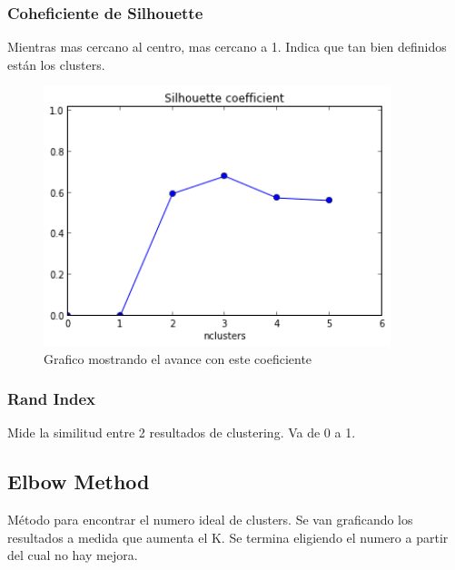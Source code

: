 \documentclass[titlepage,a4paper]{article}
\begin{document}
\subsubsection{Coheficiente de Silhouette}
Mientras mas cercano al centro, mas cercano a 1. Indica que tan bien definidos están los clusters.


\begin{figure}[!htb]
    \centering
    \includegraphics[width=0.9\textwidth]{imagenesResumen/SilhouetteCoef.png}
    \caption{Grafico mostrando el avance con este coeficiente}
\end{figure}

\subsubsection{Rand Index}

Mide la similitud entre 2 resultados de clustering. Va de 0 a 1.


\subsection{Elbow Method}
Método para encontrar el numero ideal de clusters. Se van graficando los resultados a medida que aumenta el K. Se termina eligiendo el numero a partir del cual no hay mejora.
\end{document}
